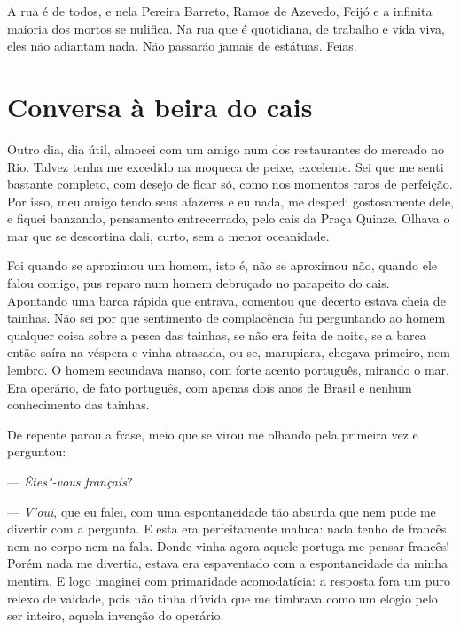  \enlargethispage{\baselineskip}

A rua é de todos, e nela Pereira Barreto, Ramos de Azevedo, Feijó e a 
infinita maioria dos mortos se nulifica. Na rua que é quotidiana, de
trabalho e vida viva, eles não adiantam nada. Não passarão 
jamais de estátuas. Feias.

\chapter{Conversa à beira do cais}

Outro dia, dia útil, almocei com um amigo num dos restaurantes do
mercado no Rio. Talvez tenha me excedido na moqueca de peixe, excelente.
Sei que me senti bastante completo, com desejo de ficar só, como nos
momentos raros de perfeição. Por isso, meu amigo tendo seus afazeres e
eu nada, me despedi gostosamente dele, e fiquei banzando, pensamento
entrecerrado, pelo cais da Praça Quinze. Olhava o mar que se descortina
dali, curto, sem a menor oceanidade.

Foi quando se aproximou um homem, isto é, não se aproximou não, quando
ele falou comigo, pus reparo num homem debruçado no parapeito do cais.
Apontando uma barca rápida que entrava, comentou que decerto estava
cheia de tainhas. Não sei por que sentimento de complacência fui
perguntando ao homem qualquer coisa sobre a pesca das tainhas, se não
era feita de noite, se a barca então saíra na véspera e vinha atrasada,
ou se, marupiara, chegava primeiro, nem lembro. O homem secundava manso,
com forte acento português, mirando o mar. Era operário, de fato
português, com apenas dois anos de Brasil e nenhum conhecimento das
tainhas.

De repente parou a frase, meio que se virou me olhando pela primeira vez
e perguntou:

--- \emph{Êtes"-vous français}?

--- \emph{V'oui}, que eu falei, com uma espontaneidade tão absurda que
nem pude me divertir com a pergunta. E esta era perfeitamente maluca:
nada tenho de francês nem no corpo nem na fala. Donde vinha agora aquele
portuga me pensar francês! Porém nada me divertia, estava era
espaventado com a espontaneidade da minha mentira. E logo imaginei com
primaridade acomodatícia: a resposta fora um puro relexo de vaidade,
pois não tinha dúvida que me timbrava como um elogio pelo ser inteiro,
aquela invenção do operário.

